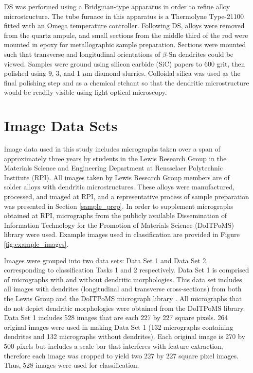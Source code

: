 DS was performed using a Bridgman-type apparatus in order to refine alloy microstructure.  The tube furnace in this apparatus is a Thermolyne Type-21100 fitted with an Omega temperature controller.
Following DS, alloys were removed from the quartz ampule, and small sections from the middle third of the rod were mounted in epoxy for metallographic sample preparation.  Sections were mounted such that transverse and longitudinal orientations of $\beta$-Sn dendrites could be viewed.  Samples were ground using silicon carbide (SiC) papers to 600 grit, then polished using 9, 3, and 1 $\mu$m diamond slurries.  Colloidal silica was used as the final polishing step and as a chemical etchant so that the dendritic microstructure would be readily visible using light optical microscopy.

\section{Image Data Sets}
\label{data_sets}

Image data used in this study includes micrographs taken over a span of approximately three years by students in the Lewis Research Group in the Materials Science and Engineering Department at Rensselaer Polytechnic Institute (RPI).  All images taken by Lewis Research Group members are of solder alloys with dendritic microstructures.  These alloys were manufactured, processed, and imaged at RPI, and a representative process of sample preparation was presented in Section \ref{sample_prep}.  In order to supplement micrographs obtained at RPI, micrographs from the publicly available Dissemination of Information Technology for the Promotion of Materials Science (DoITPoMS) library \cite{Barber2003} were used. Example images used in classification are provided in Figure \ref{fig:example_images}.   

Images were grouped into two data sets: Data Set 1 and Data Set 2, corresponding to classification Tasks 1 and 2 respectively. Data Set 1 is comprised of micrographs with and without dendritic morphologies.  This data set includes all images with dendrites (longitudinal and transverse cross-sections) from both the Lewis Group and the DoITPoMS micrograph library \cite{Barber2003}.  All micrographs that do not depict dendritic morphologies were obtained from the DoITPoMS library.  Data Set 1 includes 528 images that are each 227 by 227 square pixels. 264 original images were used in making Data Set 1 (132 micrographs containing dendrites and 132 micrographs without dendrites). Each original image is 270 by 500 pixels but includes a scale bar that interferes with feature extraction, therefore each image was cropped to yield two 227 by 227 square pixel images.  Thus, 528 images were used for classification. 

